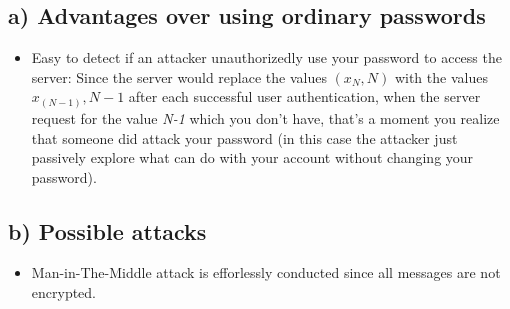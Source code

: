 \subsection*{a) Advantages over using ordinary passwords}
%

\begin{itemize}
    \item Easy to detect if an attacker unauthorizedly use your password
    to access the server: Since the server would replace the values
    \((x_N,N)\) with the values \(x_(N-1),N-1\) after each successful
    user authentication, when the server request for the value \emph{N-1}
    which you don't have, that's a moment you realize that someone did
    attack your password (in this case the attacker just passively explore
    what can do with your account without changing your password).

\end{itemize}

\subsection*{b) Possible attacks}
%
\begin{itemize}
    \item Man-in-The-Middle attack is efforlessly conducted since all messages are
    not encrypted.
\end{itemize}